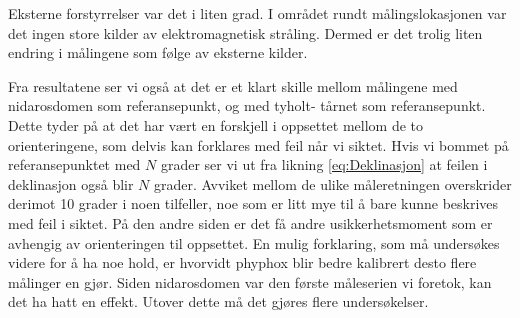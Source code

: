 \begin{itemize}
Eksterne forstyrrelser var det i liten grad. I området rundt målingslokasjonen var det ingen store kilder av elektromagnetisk stråling. Dermed er det trolig liten endring i målingene som følge av eksterne kilder. 

Fra resultatene ser vi også at det er et klart skille mellom målingene med nidarosdomen som referansepunkt, og med tyholt-
tårnet som referansepunkt. Dette tyder på at det har vært en forskjell i oppsettet mellom de to orienteringene, som delvis 
kan forklares med feil når vi siktet. Hvis vi bommet på referansepunktet med $N$ grader ser vi ut fra likning 
\eqref{eq:Deklinasjon} at feilen i deklinasjon også blir $N$ grader. Avviket mellom de ulike måleretningen overskrider 
derimot 10 grader i noen tilfeller, noe som er litt mye til å bare kunne beskrives med feil i siktet. På den andre siden er 
det få andre usikkerhetsmoment som er avhengig av orienteringen til oppsettet. En mulig forklaring, som må undersøkes videre 
for å ha noe hold, er hvorvidt phyphox blir bedre kalibrert desto flere målinger en gjør. Siden nidarosdomen var den første måleserien vi foretok, kan det ha hatt en effekt.
Utover dette må det gjøres flere undersøkelser.

\end{itemize}



 